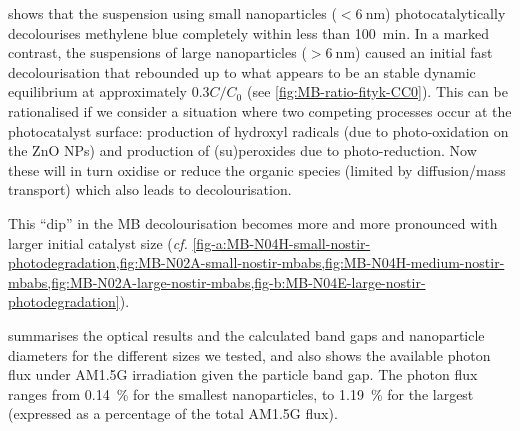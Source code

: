 \documentclass[9pt,twoside,twocolumn]{article}\usepackage{knitr}
\begin{document}
\begin{refsection}
  shows that the suspension using small nanoparticles ($<\qty{6}{\nm}$) photocatalytically decolourises methylene blue completely within less than \qty{100}{\minute}. In a marked contrast, the suspensions of large nanoparticles ($>\qty{6}{\nm}$) caused an initial fast decolourisation that rebounded up to what appears to be an stable dynamic equilibrium at approximately $0.3C/C_0$ (see \cref{fig:MB-ratio-fityk-CC0}). This can be rationalised if we consider a situation where two competing processes occur at the photocatalyst surface: production of hydroxyl radicals (due to photo-oxidation on the ZnO NPs) and production of (su)peroxides due to photo-reduction. Now these will in turn oxidise or reduce the organic species (limited by diffusion/mass transport) which also leads to decolourisation.
 
This \enquote{dip} in the MB decolourisation becomes more and more pronounced with larger initial catalyst size (\textit{cf.} \cref{fig-a:MB-N04H-small-nostir-photodegradation,fig:MB-N02A-small-nostir-mbabs,fig:MB-N04H-medium-nostir-mbabs,fig:MB-N02A-large-nostir-mbabs,fig-b:MB-N04E-large-nostir-photodegradation}).

 summarises the optical results and the calculated band gaps and nanoparticle diameters for the different sizes we tested, and also shows the available photon flux under AM1.5G irradiation given the particle band gap.
The photon flux ranges from  \qty{0.14}{\percent} for the smallest nanoparticles, to \qty{1.19}{\percent} for the largest (expressed as a percentage of the total AM1.5G flux).



\end{refsection}
\end{document}
